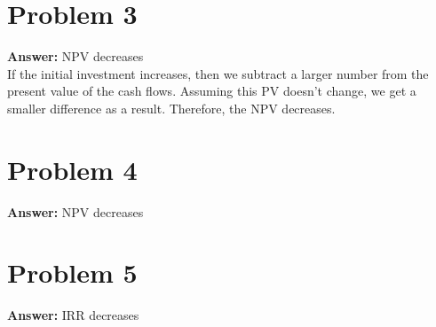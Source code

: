 \documentclass[11pt]{article}
\begin{document}
\section*{Problem 3}
\label{sec:org364b35f}

\textbf{Answer:} NPV decreases\\

If the initial investment increases, then we subtract a larger number from the
present value of the cash flows. Assuming this PV doesn't change, we get a
smaller difference as a result. Therefore, the NPV decreases.
\section*{Problem 4}
\label{sec:org9760b6e}

\textbf{Answer:} NPV decreases
\section*{Problem 5}
\label{sec:org74cc7c4}

\textbf{Answer:} IRR decreases\\
\end{document}
